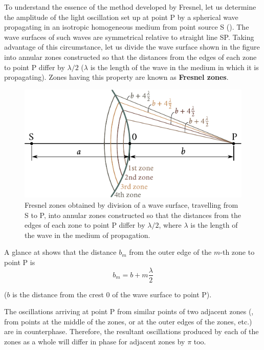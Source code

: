 To understand the essence of the method developed by Fresnel, let us determine the amplitude of the light oscillation set up at point P by a spherical wave propagating in an isotropic homogeneous medium from point source S ().
The wave surfaces of such waves are symmetrical relative to straight line SP.
Taking advantage of this circumstance, let us divide the wave surface shown in the figure into annular zones constructed so that the distances from the edges of each zone to point P differ by $\lambda/2$ ($\lambda$ is the length of the wave
in the medium in which it is propagating).
Zones having this property are known as \textbf{Fresnel zones}.

\begin{figure}[t]
	\begin{center}
		\includegraphics[scale=1]{figures/ch_18/fig_18_4.pdf}
        \caption[]{Fresnel zones obtained by division of a wave surface, travelling from S to P,  into annular zones constructed so that the distances from the edges of each zone to point P differ by $\lambda/2$, where $\lambda$ is the length of the wave in the medium of propagation.}
		\label{fig:18_4}
	\end{center}
	\vspace{-0.8cm}
\end{figure}

A glance at  shows that the distance $b_m$ from the outer edge of the $m$-th zone to point P is
\begin{equation}\label{eq:18_4}
    b_m = b + m \frac{\lambda}{2}
\end{equation}

\noindent
($b$ is the distance from the crest $0$ of the wave surface to point P).

The oscillations arriving at point P from similar points of two adjacent zones (\ie, from points at the middle of the zones, or at the outer edges of the zones, etc.) are in counterphase.
Therefore, the resultant oscillations produced by each of the zones as a whole will differ in phase for adjacent zones by $\pi$ too.

